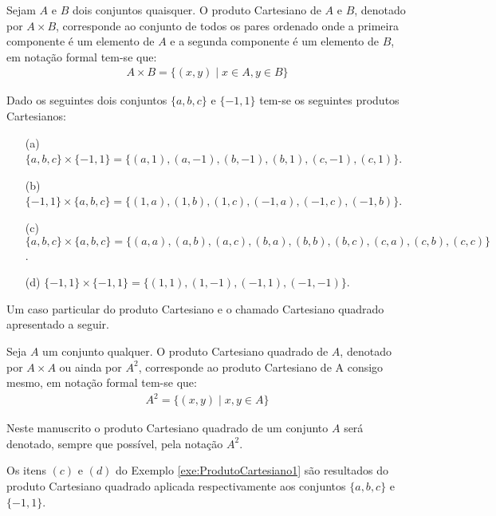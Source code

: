 \begin{definition}\label{def:ProdutoCartesiano}
	Sejam $A$ e $B$ dois conjuntos quaisquer. O produto Cartesiano de $A$ e $B$, denotado por $A \times B$, corresponde ao conjunto de todos os pares ordenado onde a primeira componente é um elemento de $A$ e a segunda componente é um elemento de $B$, em notação formal tem-se que:
	\begin{eqnarray*}
		A \times B = \{(x, y) \mid x \in A, y \in B\}
	\end{eqnarray*}
\end{definition}

\begin{exem}\label{exe:ProdutoCartesiano1}
	Dado os seguintes dois conjuntos $\{a, b, c\}$ e $\{-1, 1\}$ tem-se os seguintes produtos Cartesianos:
	\begin{itemize}
		\item[(a)] $\{a, b, c\} \times \{-1, 1\}  = \{(a, 1), (a, -1), (b, -1), (b, 1), (c, -1), (c, 1)\}$.
		\item[(b)] $\{-1, 1\} \times \{a, b, c\}  = \{(1, a), (1, b), (1, c), (-1, a), (-1, c), (-1, b)\}$.
		\item[(c)] $\{a, b, c\} \times \{a, b, c\}   = \{(a, a), (a, b), (a, c), (b, a), (b, b), (b, c), (c, a), (c, b), (c, c)\}$.
		\item[(d)] $\{-1, 1\} \times \{-1, 1\} = \{(1, 1), (1, -1), (-1, 1), (-1, -1)\}$.
	\end{itemize}
\end{exem}

Um caso particular do produto Cartesiano e o chamado Cartesiano quadrado apresentado a seguir.

\begin{definition}\label{def:CartesianoQuadrado}
	Seja $A$ um conjunto qualquer. O produto Cartesiano quadrado de $A$, denotado por $A \times A$ ou ainda por $A^2$, corresponde ao produto Cartesiano de A consigo mesmo, em notação formal tem-se que:
	\begin{eqnarray*}
		A^2 = \{(x, y) \mid x, y \in A\}
	\end{eqnarray*}
\end{definition}

\begin{rema}
	Neste manuscrito o produto Cartesiano quadrado de um conjunto $A$ será denotado, sempre que possível, pela notação $A^2$.
\end{rema}

\begin{exem}\label{exe:ProdutoCartesiano2}
	Os itens $(c)$ e $(d)$ do Exemplo \ref{exe:ProdutoCartesiano1} são resultados do produto Cartesiano quadrado aplicada respectivamente aos conjuntos $\{a, b, c\}$ e $\{-1, 1\}$.
\end{exem}

